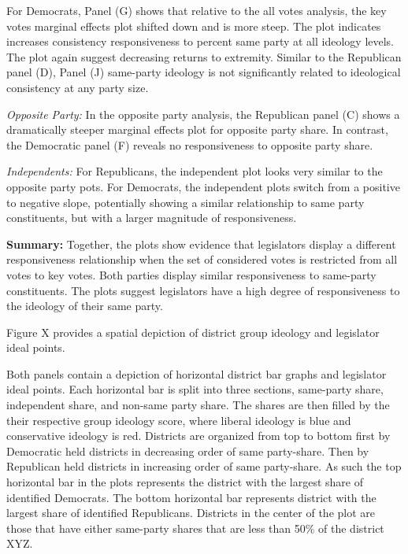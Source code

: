 \documentclass[10pt,letterpaper]{article}
\begin{document}
For Democrats, Panel (G) shows that relative to the all votes analysis, the key votes marginal effects plot shifted down and is more steep. The plot indicates increases consistency responsiveness to percent same party at all ideology levels. The plot again suggest decreasing returns to extremity. Similar to the Republican panel (D), Panel (J) same-party ideology is not significantly related to ideological consistency at any party size.

\textit{Opposite Party:} In the opposite party analysis, the Republican panel (C) shows a dramatically steeper marginal effects plot for opposite party share. In contrast, the Democratic panel (F) reveals no responsiveness to opposite party share.

\textit{Independents:} For Republicans, the independent plot looks very similar to the opposite party pots. For Democrats, the independent plots switch from a positive to negative slope, potentially showing a similar relationship to same party constituents, but with a larger magnitude of responsiveness.

\textbf{Summary:} Together, the plots show evidence that legislators display a different responsiveness relationship when the set of considered votes is restricted from all votes to key votes. Both parties display similar responsiveness to same-party constituents. The plots suggest legislators have a high degree of responsiveness to the ideology of their same party.



Figure X provides a spatial depiction of district group ideology and legislator ideal points.

Both panels contain a depiction of horizontal district bar graphs and legislator ideal points. Each horizontal bar is split into three sections, same-party share, independent share, and non-same party share. The shares are then filled by the their respective group ideology score, where liberal ideology is blue and conservative ideology is red. Districts are organized from top to bottom first by Democratic held districts in decreasing order of same party-share. Then by Republican held districts in increasing order of same party-share. As such the top horizontal bar in the plots represents the district with the largest share of identified Democrats. The bottom horizontal bar represents district with the largest share of identified Republicans. Districts in the center of the plot are those that have either same-party shares that are less than 50\% of the district XYZ.  
\end{document}
